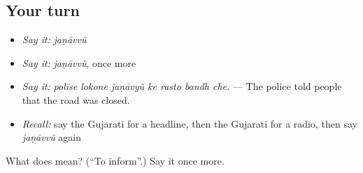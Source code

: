 \subsection*{Your turn}
\begin{itemize}
\raggedright
  \item \emph{Say it:} \emph{jaṇāvvũ}
  \item \emph{Say it:} \emph{jaṇāvvũ}, once more
  \item \emph{Say it:} \emph{polīse lokone jaṇāvyũ ke rasto bandh che.} — The police told people that the road was closed.
  \item \emph{Recall:} say the Gujarati for a headline, then the Gujarati for a radio, then say \emph{jaṇāvvũ} again
\end{itemize}

\begin{tcolorbox}[breakable,colback=teal!4,colframe=teal!35!black,title={Before you move on}]
What does  mean? (\textquotedblleft{}To inform\textquotedblright{}.) Say it once more.
\end{tcolorbox}
